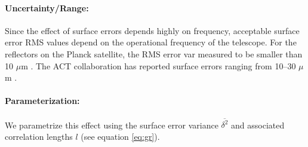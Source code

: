 \paragraph{Uncertainty/Range:}
Since the effect of surface errors depends highly on frequency, acceptable surface error RMS values depend on the operational frequency of the telescope. For the reflectors on the Planck satellite, the RMS error var measured to be smaller than 10 $\mu$m \cite{Tauber2010}. The ACT collaboration has reported surface errors ranging from 10--30 $\mu$m \cite{Hincks2008}.

\paragraph{Parameterization:}
We parametrize this effect using the surface error variance $\overline{\delta^2}$ and associated correlation lengths $l$ (see equation \ref{eq:gr}). 